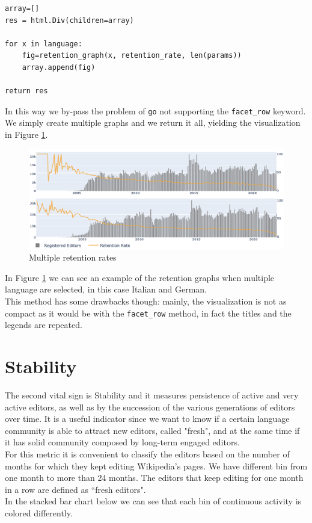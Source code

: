 \lstset{frame=lines}
\lstset{basicstyle=\footnotesize}
\lstset{caption=For-loop to return multiple charts}
\begin{lstlisting}
array=[]
res = html.Div(children=array)

for x in language:
    fig=retention_graph(x, retention_rate, len(params))
    array.append(fig)

return res
\end{lstlisting}

In this way we by-pass the problem of \verb#go# not supporting the \verb#facet_row# keyword. We simply create multiple graphs and we return it all, yielding the visualization in Figure \ref{fig:multiple_retention}.

\begin{figure}[h!]
    \centering
    \includegraphics[width=470px]{img/multiple_retention.png}
    \caption{Multiple retention rates}
    \label{fig:multiple_retention}
\end{figure}

In Figure \ref{fig:multiple_retention} we can see an example of the retention graphs when multiple language are selected, in this case Italian and German.\\
This method has some drawbacks though: mainly, the visualization is not as compact as it would be with the \verb#facet_row# method, in fact the titles and the legends are repeated.

\section{Stability}
\label{sec:stability}

The second vital sign is Stability and it measures persistence of active and very active editors, as well as by the succession of the various generations of editors over time. It is a useful indicator since we want to know if a certain language community is able to attract new editors, called "fresh", and at the same time if it has solid community composed by long-term engaged editors.\\
For this metric it is convenient to classify the editors based on the number of months for which they kept editing Wikipedia's pages. We have different bin from one month to more than 24 months. The editors that keep editing for one month in a row are defined as ``fresh editors".\\
In the stacked bar chart below we can see that each bin of continuous activity is colored differently.

